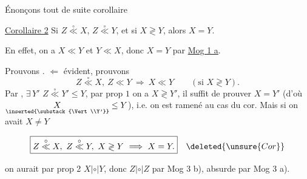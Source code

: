 Énonçons tout de suite corollaire

\uline{Corollaire 2} Si $Z\overset{\circ}{\ll}X$, $Z\overset{\circ}{\ll}Y$, et si $X\gtrless Y$, alors $X=Y$.

En effet, on a $X\ll Y$ et $Y\ll X$, donc $X=Y$ par \uline{Mog 1 a}.

Prouvons . $\Longleftarrow$ évident, prouvons
\[
Z\overset{\circ}{\ll}X,\ Z\ll Y\ \Longrightarrow\ X\ll Y\qquad(\text{si }X\gtrless Y).
\]
 Par , $\exists\,Y'$  $Z\overset{\circ}{\ll}Y'\leq Y$, par prop $1$ on a $X\gtrless Y'$, il suffit de prouver $X=Y'$ (d'où $\underset{\inserted{\substack{\Vert\\Y'}}}{X}\leq Y$), i.e. on est ramené au cas du cor. Mais si on avait $X\neq Y$

\[
\boxed{Z\overset{\circ}{\ll}X,\ Z\overset{\circ}{\ll}Y,\ X\gtrless Y\ \Longrightarrow\ X=Y.}\quad\deleted{\unsure{Cor}}
\]



on aurait par prop 2 $X\mathrel{|\circ|}Y$, donc $Z\mathrel{|\circ|}Z$ par Mog 3 b), absurde par Mog 3 a).
